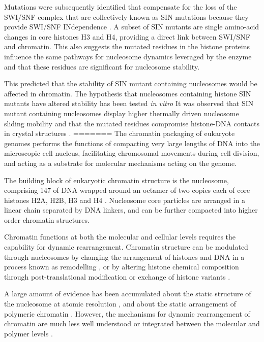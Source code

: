     Mutations were subsequently identified that compensate for the loss of the SWI/SNF complex
    that are collectively known as SIN mutations because they provide SWI/SNF INdependence .
    A subset of SIN mutants are single amino-acid changes in core histones H3 and H4,
    providing a direct link between SWI/SNF and chromatin.
    This also suggests the mutated residues in the histone proteins 
    influence the same pathways for nucleosome dynamics leveraged by the enzyme 
    and that these residues are significant for nucleosome stability.

    This predicted that the stability of SIN mutant containing nucleosomes would be affected in chromatin.
    The hypothesis that nucleosomes containing histone SIN mutants
    have altered stability has been tested \textit{in vitro}
    It was observed that SIN mutant containing nucleosomes display higher 
    thermally driven nucleosome sliding mobility \citep{flaus2004sin}
    and that the mutated residues compromise histone-DNA contacts in crystal structures .
=======
    The chromatin packaging of eukaryote genomes performs the
    functions of compacting very large lengths of DNA into the
    microscopic cell nucleus, facilitating chromosomal movements
    during cell division, and acting as a substrate for molecular
    mechanisms acting on the genome.

    The building block of eukaryotic chromatin structure is the
    nucleosome, comprising \SI{147}{\bp} of DNA wrapped around an
    octamer of two copies each of core histones H2A, H2B, H3 and H4
    \citep{luger1997crystal}.  Nucleosome core particles are arranged
    in a linear chain separated by DNA linkers, and can be further
    compacted into higher order chromatin structures.

    Chromatin functions at both the molecular and cellular levels
    requires the capability for dynamic rearrangement.  Chromatin
    structure can be modulated through nucleosomes by changing the
    arrangement of histones and DNA in a process known as remodelling
    , or by altering histone chemical composition through
    post-translational modification  or exchange of histone
    variants .

    A large amount of evidence has been accumulated about the static
    structure of the nucleosome at atomic resolution , and
    about the static arrangement of polymeric chromatin .
    However, the mechanisms for dynamic rearrangement of chromatin are
    much less well understood or integrated between the molecular and
    polymer levels .

